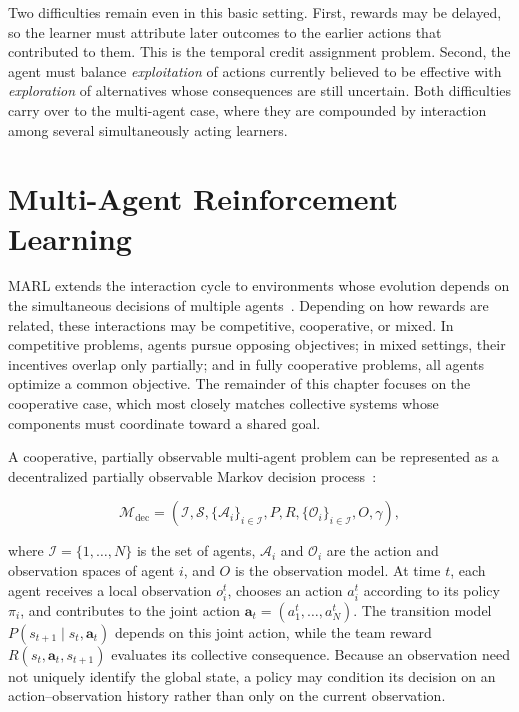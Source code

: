 Two difficulties remain even in this basic setting.
%
First, rewards may be delayed, so the learner must attribute later outcomes to
the earlier actions that contributed to them. This is the temporal credit
assignment problem.
%
Second, the agent must balance \emph{exploitation} of actions currently believed
to be effective with \emph{exploration} of alternatives whose consequences are
still uncertain.
%
Both difficulties carry over to the multi-agent case, where they are compounded
by interaction among several simultaneously acting learners.


\section{Multi-Agent Reinforcement Learning}
\label{sec:rl-multi-agent}

\gls{MARL} extends the interaction cycle to environments whose evolution depends
on the simultaneous decisions of multiple agents~\cite{DBLP:journals/smca/BusonuiBDS08}.
%
Depending on how rewards are related, these interactions may be competitive,
cooperative, or mixed.
%
In competitive problems, agents pursue opposing objectives; in mixed settings,
their incentives overlap only partially; and in fully cooperative problems, all
agents optimize a common objective.
%
The remainder of this chapter focuses on the cooperative case, which most closely
matches collective systems whose components must coordinate toward a shared goal.

A cooperative, partially observable multi-agent problem can be represented as a
decentralized partially observable Markov decision process~\cite{Oliehoek2016}:

\begin{equation}
  \mathcal{M}_{\mathrm{dec}} =
  (\mathcal{I},\mathcal{S},\{\mathcal{A}_i\}_{i\in\mathcal{I}},P,R,
   \{\mathcal{O}_i\}_{i\in\mathcal{I}},O,\gamma),
  \label{eq:decpomdp-tuple}
\end{equation}

where $\mathcal{I}=\{1,\ldots,N\}$ is the set of agents,
$\mathcal{A}_i$ and $\mathcal{O}_i$ are the action and observation spaces of
agent $i$, and $O$ is the observation model.
%
At time $t$, each agent receives a local observation $o_i^t$, chooses an action
$a_i^t$ according to its policy $\pi_i$, and contributes to the joint action
$\mathbf{a}_t=(a_1^t,\ldots,a_N^t)$.
%
The transition model $P(s_{t+1}\mid s_t,\mathbf{a}_t)$ depends on this joint
action, while the team reward $R(s_t,\mathbf{a}_t,s_{t+1})$ evaluates its
collective consequence.
%
Because an observation need not uniquely identify the global state, a policy may
condition its decision on an action--observation history rather than only on the
current observation.

